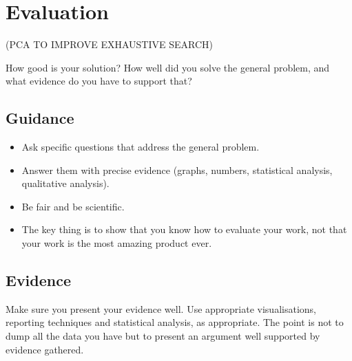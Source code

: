 \documentclass{l4proj}
\begin{document}





\chapter{Evaluation} 
(PCA TO IMPROVE EXHAUSTIVE SEARCH)

How good is your solution? How well did you solve the general problem, and what evidence do you have to support that?

\section{Guidance}
\begin{itemize}
    \item
        Ask specific questions that address the general problem.
    \item
        Answer them with precise evidence (graphs, numbers, statistical
        analysis, qualitative analysis).
    \item
        Be fair and be scientific.
    \item
        The key thing is to show that you know how to evaluate your work, not
        that your work is the most amazing product ever.
\end{itemize}

\section{Evidence}
Make sure you present your evidence well. Use appropriate visualisations, 
reporting techniques and statistical analysis, as appropriate. The point is not
to dump all the data you have but to present an argument well supported by evidence gathered.
\end{document}
